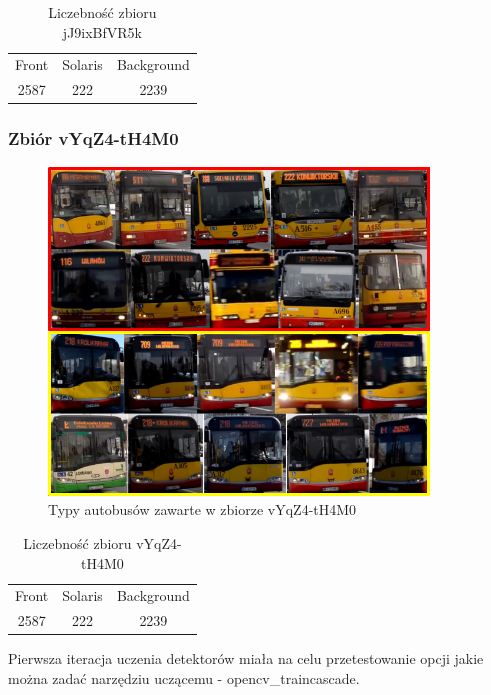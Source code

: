 \begin{table}[!h]
    \centering
    \begin{tabular}{c|c|c}
        Front   & Solaris   & Background \\
        2587    & 222       & 2239
    \end{tabular}
    \caption{Liczebność zbioru jJ9ixBfVR5k}
    \label{tab:jJ9ixBfVR5k_count}
\end{table}

\subsubsection{Zbiór vYqZ4-tH4M0}

\begin{figure}[!h]
    \centering
    \includegraphics[width=0.9\textwidth]{img/exp_trainig_data_vYq}
    \caption{Typy autobusów zawarte w zbiorze vYqZ4-tH4M0}
    \label{fig:vYqZ4-tH4M0_types}
\end{figure}

\begin{table}[!h]
    \centering
    \begin{tabular}{c|c|c}
        Front   & Solaris   & Background \\
        2587    & 222       & 2239
    \end{tabular}
    \caption{Liczebność zbioru vYqZ4-tH4M0}
    \label{tab:vYqZ4-tH4M0_count}
\end{table}

Pierwsza iteracja uczenia detektorów miała na celu przetestowanie
opcji jakie można zadać narzędziu uczącemu - opencv\_traincascade.

